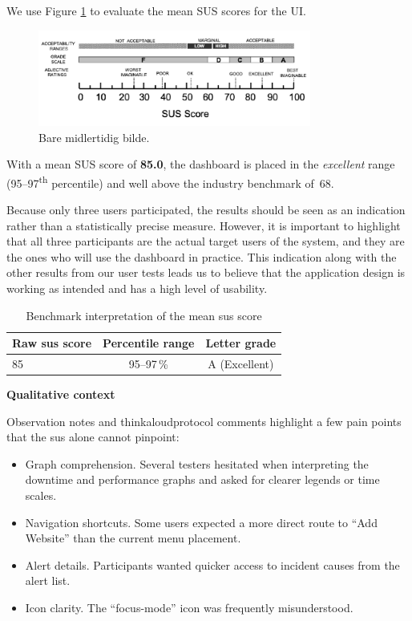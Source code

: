 We use Figure \ref{fig:sus_scores} to evaluate the mean SUS scores for the UI.

\begin{figure}[H]
        \centering
        \includegraphics[width=0.8\textwidth]{figures/Grade-rankings-of-SUS-scores-from-An-Empirical-Evaluation-of-the-System-Usability.png}
        \caption{Bare midlertidig bilde.}
        \label{fig:sus_scores}
\end{figure}


With a mean SUS score of \textbf{85.0}, the dashboard is placed in the \emph{excellent} range (95–97\textsuperscript{th} percentile) and well above the industry benchmark of~68. 

Because only three users participated, the results should be seen as an indication rather than a statistically precise measure. However, it is important to highlight that all three participants are the actual target users of the system, and they are the ones who will use the dashboard in practice. 
This indication along with the other results from our user tests leads us to believe that the application design is working as intended and has a high level of usability. 

\begin{table}[H]
\centering
\begin{tabular}{@{}lcc@{}}
\toprule
\textbf{Raw \acrshort{sus} score} & \textbf{Percentile range} & \textbf{Letter grade} \\
\midrule
85 & 95--97\,\% & A (Excellent) \\
\bottomrule
\end{tabular}
\label{tab:sus-benchmark}
\caption{Benchmark interpretation of the mean \acrshort{sus} score}
\end{table}

\textbf{Qualitative context}

Observation notes and \gls{thinkaloudprotocol} comments highlight a few pain points that the \acrshort{sus} alone cannot pinpoint:

\begin{itemize}
    \item Graph comprehension. Several testers hesitated when interpreting the downtime and performance graphs and asked for clearer legends or time scales.
    \item Navigation shortcuts. Some users expected a more direct route to “Add Website” than the current menu placement.
    \item Alert details. Participants wanted quicker access to incident causes from the alert list.
    \item Icon clarity. The “focus-mode” icon was frequently misunderstood.
\end{itemize}

